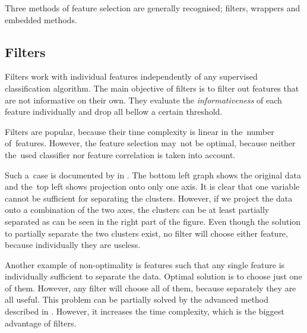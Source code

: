 Three methods of feature selection are generally recognised; filters, wrappers and embedded methods.

\subsection{Filters}
\label{subsec:filters}

Filters work with individual features independently of any supervised classification algorithm.
The main objective of filters is to filter out features that are not informative on their own.
They evaluate the \textit{informativeness} of each feature individually
and drop all bellow a certain threshold.

Filters are popular, because their time complexity is linear in the~number of~features.
However, the feature selection may~not be optimal,
because neither the~used classifier nor feature correlation is taken into account.

Such a~case is documented by \citet{GuyEli03} in .
The bottom left graph shows the original data and the~top left shows projection onto only one axis.
It is clear that one variable cannot be sufficient for separating the clusters.
However, if we project the data onto a combination of the two axes,
the clusters can be at least partially separated as can be seen in the right part of the figure.
Even though the solution to partially separate the two clusters exist,
no filter will choose either feature, because individually they are useless.

Another example of non-optimality is
features such that any single feature is individually sufficient to separate the data.
Optimal solution is  to choose just one of them.
However, any filter will choose all of them, because separately they are all useful.
This problem can be partially solved by the advanced method described in .
However, it increases the time complexity, which is the biggest advantage of filters.

 

